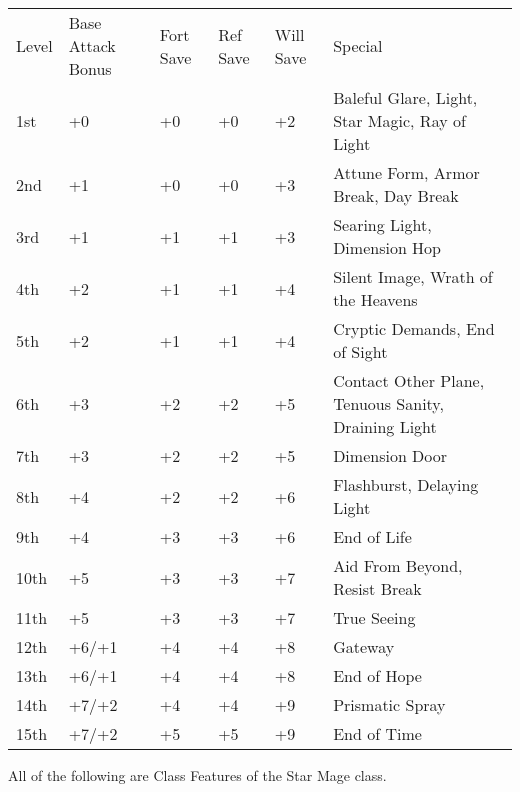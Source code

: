 \begin{table}[tbh]
\begin{small}
\begin{tabular}{lp{2cm}p{1cm}p{1cm}p{0.7cm}l}
Level  &Base Attack Bonus &Fort Save &Ref Save &Will Save &Special\\
1st &+0 &+0 &+0 &+2 &Baleful Glare, Light, Star Magic, Ray of Light\\
2nd &+1 &+0 &+0 &+3 &Attune Form, Armor Break, Day Break\\
3rd &+1 &+1 &+1 &+3 &Searing Light, Dimension Hop\\
4th &+2 &+1 &+1 &+4 &Silent Image, Wrath of the Heavens\\
5th &+2 &+1 &+1 &+4 &Cryptic Demands, End of Sight\\
6th &+3 &+2 &+2 &+5 &Contact Other Plane, Tenuous Sanity, Draining Light\\
7th &+3 &+2 &+2 &+5 &Dimension Door\\
8th &+4 &+2 &+2 &+6 &Flashburst, Delaying Light\\
9th &+4 &+3 &+3 &+6 &End of Life\\
10th &+5 &+3 &+3 &+7 &Aid From Beyond, Resist Break\\
11th &+5 &+3 &+3 &+7 &True Seeing\\
12th &+6/+1 &+4 &+4 &+8 &Gateway\\
13th &+6/+1 &+4 &+4 &+8 &End of Hope\\
14th &+7/+2 &+4 &+4 &+9 &Prismatic Spray\\
15th &+7/+2 &+5 &+5 &+9 &End of Time\\
\end{tabular}
\end{small}
\end{table}

\smallskip\noindent All of the following are Class Features of the Star Mage class.



